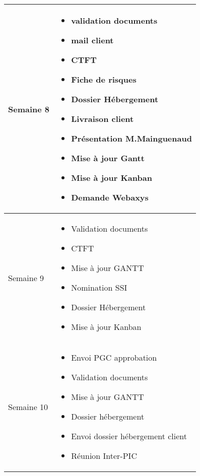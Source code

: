 \documentclass [a4paper] {article}
\begin{document}
\begin{tabularx}{16.8cm}{|>{\columncolor{gray!40}}l|X|}
	\hline
	Semaine 8 & \begin{itemize}
		\item validation documents
		\item mail client
		\item CTFT
		\item Fiche de risques
		\item Dossier Hébergement
		\item Livraison client
		\item Présentation M.Mainguenaud
		\item Mise à jour Gantt
		\item Mise à jour Kanban
		\item Demande Webaxys
	\end{itemize} \\
	\hline
	Semaine 9 & \begin{itemize}
		\item Validation documents
		\item CTFT
		\item Mise à jour GANTT
		\item Nomination SSI
		\item Dossier Hébergement
		\item Mise à jour Kanban
	\end{itemize} \\
	\hline
	Semaine 10 & \begin{itemize}
		\item Envoi PGC approbation
		\item Validation documents
		\item Mise à jour GANTT
		\item Dossier hébergement
		\item Envoi dossier hébergement client
		\item Réunion Inter-PIC
	\end{itemize} \\
	\hline
\end{tabularx}
\end{document}
